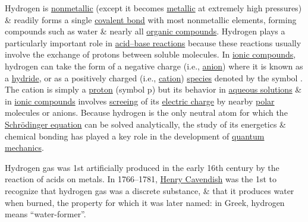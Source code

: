 \documentclass{article}
\begin{document}
Hydrogen is \href{https://en.wikipedia.org/wiki/Nonmetallic}{nonmetallic} (except it becomes \href{https://en.wikipedia.org/wiki/Metallic_hydrogen}{metallic} at extremely high pressures) \& readily forms a single \href{https://en.wikipedia.org/wiki/Covalent_bond}{covalent bond} with most nonmetallic elements, forming compounds such as water \& nearly all \href{https://en.wikipedia.org/wiki/Organic_compound}{organic compounds}. Hydrogen plays a particularly important role in \href{https://en.wikipedia.org/wiki/Acid%E2%80%93base_reaction}{acid--base reactions} because these reactions usually involve the exchange of protons between soluble molecules. In \href{https://en.wikipedia.org/wiki/Ionic_compound}{ionic compounds}, hydrogen can take the form of a negative charge (i.e., \href{https://en.wikipedia.org/wiki/Anion}{anion}) where it is known as a \href{https://en.wikipedia.org/wiki/Hydride}{hydride}, or as a positively charged (i.e., \href{https://en.wikipedia.org/wiki/Cation}{cation}) \href{https://en.wikipedia.org/wiki/Chemical_species}{species} denoted by the symbol \ce{H^+}. The \ce{H^+} cation is simply a \href{https://en.wikipedia.org/wiki/Proton}{proton} (symbol p) but its behavior in \href{https://en.wikipedia.org/wiki/Aqueous_solution}{aqueous solutions} \& in \href{https://en.wikipedia.org/wiki/Ionic_compound}{ionic compounds} involves \href{https://en.wikipedia.org/wiki/Electric-field_screening}{screeing} of its \href{https://en.wikipedia.org/wiki/Electric_charge}{electric charge} by nearby \href{https://en.wikipedia.org/wiki/Chemical_polarity}{polar} molecules or anions. Because hydrogen is the only neutral atom for which the \href{https://en.wikipedia.org/wiki/Schr%C3%B6dinger_equation}{Schr\"odinger equation} can be solved analytically, the study of its energetics \& chemical bonding has played a key role in the development of \href{https://en.wikipedia.org/wiki/Quantum_mechanics}{quantum mechanics}.

Hydrogen gas was 1st artificially produced in the early 16th century by the reaction of acids on metals. In 1766--1781, \href{https://en.wikipedia.org/wiki/Henry_Cavendish}{Henry Cavendish} was the 1st to recognize that hydrogen gas was a discrete substance, \& that it produces water when burned, the property for which it was later named: in Greek, hydrogen means ``water-former''.
\end{document}
